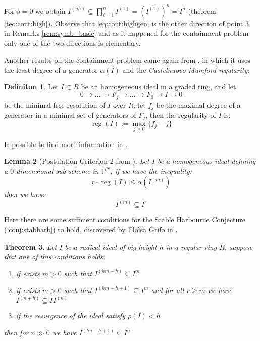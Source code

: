 \documentclass[a4wide]{book}
\theoremstyle{plain}
\newtheorem{teo}{Theorem}[section]
\newtheorem{lem}[teo]{Lemma}
\theoremstyle{remark}
\theoremstyle{definition}
\newtheorem{deff}[teo]{Definiton}
\newcommand{\PP}{\mathbb{P}}
\newcommand{\cont}[2]{ I^{(#1)} \subseteq I^{#2}}
\DeclareMathOperator{\reg}{reg}
\begin{document}
For $ s=0 $ we obtain $ I^{(nh)} \subseteq \prod_{i=1}^{n} I^{(1)} = ( I^{(1)} )^n = I^n$ (theorem \ref{teo:cont:bigh}). Observe that \ref{eq:cont:bighgen} is the other direction of point $ 3. $ in Remarks \ref{rem:symb_basic} and as it happened for the containment problem only one of the two directions is elementary. 

Another results on the containment problem came again from \cite{BocciHrabourne10}, in which it uses the least degree of a generator $\alpha(I)$ and the \textit{Castelnuovo-Mumford regularity}:

\begin{deff} \label{def:reg}
Let $ I \subset R $ be an homogeneous ideal in a graded ring, and let 
\[
0 \to \dots \to F_j \to \dots \to F_0 \to I \to 0
\]
be the minimal free resolution of $ I $ over $ R $, let $ f_j $ be the maximal degree of a generator in a minimal set of generators of  $ F_j $, then the regularity of $ I $ is:
\[ 
 \reg(I) := \max_{j\geq 0} \{f_j - j \}
\]
\end{deff}

Is possible to find more information in \cite[Section 20.5]{Eisenbud95}. 

\begin{lem}[Postulation Criterion 2 from \cite{BocciHrabourne10}] \label{lem:cont:reg}
Let $ I $ be a homogeneous ideal defining a $ 0 $-dimensional sub-scheme in $ \PP^N $, if we have the inequality:
\begin{equation}\label{eq:cont:reg}
r \cdot \reg(I) \leq \alpha(I^{(m)})
\end{equation}
then we have:
\[ \cont{m}{r}\]
\end{lem}


Here there are some sufficient conditions for the Stable Harbourne Conjecture (\ref{conj:stabharb}) to hold, discovered by Eloìsa Grifo in \cite{Grifo20}. 


\begin{teo} \label{teo:cont:grifo0}
Let $ I $ be a radical ideal of big height $ h $ in a regular ring $ R $, suppose that one of this conditions holds:
\begin{enumerate}
\item if exists $ m>0 $ such that $ \cont{hm - h}{m} $
\item if exists $ m>0 $ such that $ \cont{hm - h +1 }{m} $ and for all $ r \geq m $ we have $ \cont{n+h }{ }I^{(n)}$
\item if the resurgence of the ideal satisfy $ \rho(I) < h $
\end{enumerate}
then for $ n \gg 0  $ we have $ \cont{hn - h +1}{n} $
\end{teo}
\end{document}
